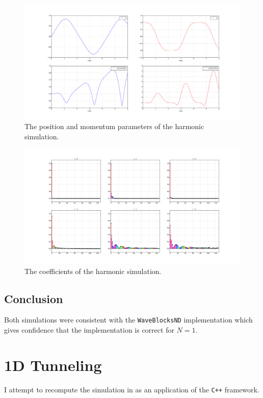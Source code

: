 \begin{figure}
\includegraphics[width=\textwidth]{Figures/anharm_params.pdf}
\caption{The position and momentum parameters of the harmonic simulation.}
\end{figure}
\begin{figure}
\includegraphics[width=\textwidth]{Figures/anharm_coeffs.pdf}
\caption{The coefficients of the harmonic simulation.}
\end{figure}
\FloatBarrier

\subsection{Conclusion}
Both simulations were consistent with the \texttt{WaveBlocksND} implementation which gives confidence that the implementation is correct for $N=1$.

\section{1D Tunneling}
I attempt to recompute the simulation in \cite{GHJ_tunneling_spawning} as an application of the \texttt{C++} framework.

